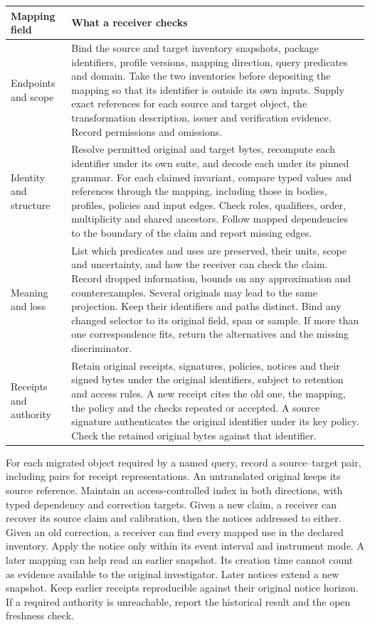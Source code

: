 \documentclass[11pt,a4paper]{article}
\begin{document}
\small
\begin{tabularx}{\linewidth}{@{}L{.205\linewidth}Y@{}}
\toprule
\textbf{Mapping field} & \textbf{What a receiver checks} \\ \midrule
Endpoints and scope & Bind the source and target inventory snapshots, package identifiers, profile versions, mapping direction, query predicates and domain. Take the two inventories before depositing the mapping so that its identifier is outside its own inputs. Supply exact references for each source and target object, the transformation description, issuer and verification evidence. Record permissions and omissions. \\
Identity and structure & Resolve permitted original and target bytes, recompute each identifier under its own suite, and decode each under its pinned grammar. For each claimed invariant, compare typed values and references through the mapping, including those in bodies, profiles, policies and input edges. Check roles, qualifiers, order, multiplicity and shared ancestors. Follow mapped dependencies to the boundary of the claim and report missing edges. \\
Meaning and loss & List which predicates and uses are preserved, their units, scope and uncertainty, and how the receiver can check the claim. Record dropped information, bounds on any approximation and counterexamples. Several originals may lead to the same projection. Keep their identifiers and paths distinct. Bind any changed selector to its original field, span or sample. If more than one correspondence fits, return the alternatives and the missing discriminator. \\
Receipts and authority & Retain original receipts, signatures, policies, notices and their signed bytes under the original identifiers, subject to retention and access rules. A new receipt cites the old one, the mapping, the policy and the checks repeated or accepted. A source signature authenticates the original identifier under its key policy. Check the retained original bytes against that identifier. \\
\bottomrule
\end{tabularx}
\normalsize

For each migrated object required by a named query, record a source--target pair, including pairs for receipt representations. An untranslated original keeps its source reference. Maintain an access-controlled index in both directions, with typed dependency and correction targets. Given a new claim, a receiver can recover its source claim and calibration, then the notices addressed to either. Given an old correction, a receiver can find every mapped use in the declared inventory. Apply the notice only within its event interval and instrument mode. A later mapping can help read an earlier snapshot. Its creation time cannot count as evidence available to the original investigator. Later notices extend a new snapshot. Keep earlier receipts reproducible against their original notice horizon. If a required authority is unreachable, report the historical result and the open freshness check.
\end{document}
